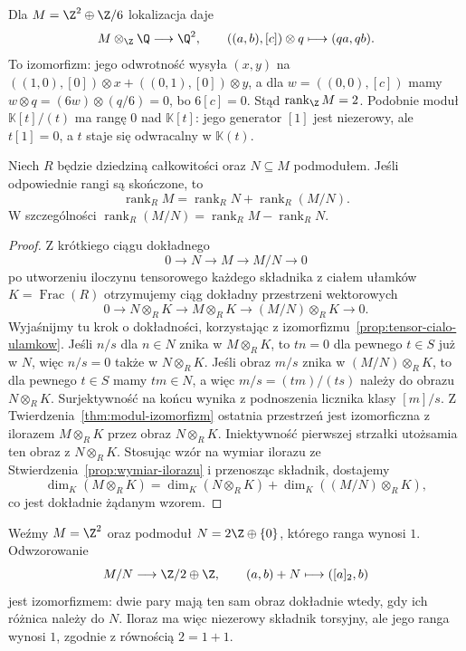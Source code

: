 \begin{przyklad}
Dla $M=\Z^2\oplus\Z/6$ lokalizacja daje
\[
 M\otimes_{\Z}\Q\longrightarrow\Q^2,\qquad
 ((a,b),[c])\otimes q\longmapsto(qa,qb).
\]
To izomorfizm: jego odwrotność wysyła $(x,y)$ na
$((1,0),[0])\otimes x+((0,1),[0])\otimes y$,
a dla $w=((0,0),[c])$ mamy
$w\otimes q=(6w)\otimes(q/6)=0$, bo $6[c]=0$.
Stąd $\operatorname{rank}_{\Z}M=2$.
Podobnie moduł $\mathbb K[t]/(t)$ ma rangę $0$
nad $\mathbb K[t]$: jego generator $[1]$ jest niezerowy,
ale $t[1]=0$, a $t$ staje się odwracalny w
$\mathbb K(t)$.
\end{przyklad}

\begin{stwierdzenie}
\label{prop:ranga-ilorazu}
Niech $R$ będzie dziedziną całkowitości oraz
$N\subseteq M$ podmodułem. Jeśli odpowiednie rangi są skończone, to
\[
\operatorname{rank}_R M
=
\operatorname{rank}_R N
+
\operatorname{rank}_R(M/N).
\]
W szczególności $\operatorname{rank}_R(M/N)
=\operatorname{rank}_R M-\operatorname{rank}_R N$.
\end{stwierdzenie}

\begin{proof}
Z krótkiego ciągu dokładnego
\[
0\longrightarrow N
\longrightarrow M
\longrightarrow M/N
\longrightarrow0
\]
po utworzeniu iloczynu tensorowego każdego składnika
z ciałem ułamków $K=\operatorname{Frac}(R)$
otrzymujemy ciąg dokładny przestrzeni wektorowych
\[
0
\longrightarrow
N\otimes_R K
\longrightarrow
M\otimes_R K
\longrightarrow
(M/N)\otimes_R K
\longrightarrow0.
\]
Wyjaśnijmy tu krok o dokładności, korzystając z
izomorfizmu~\ref{prop:tensor-cialo-ulamkow}. Jeśli $n/s$
dla $n\in N$ znika w $M\otimes_R K$, to $tn=0$
dla pewnego $t\in S$ już w $N$, więc $n/s=0$ także
w $N\otimes_R K$. Jeśli obraz $m/s$ znika w
$(M/N)\otimes_R K$, to dla pewnego $t\in S$ mamy
$tm\in N$, a więc $m/s=(tm)/(ts)$ należy do obrazu
$N\otimes_R K$. Surjektywność na końcu wynika z
podnoszenia licznika klasy $[m]/s$.
Z Twierdzenia~\ref{thm:modul-izomorfizm} ostatnia przestrzeń
jest izomorficzna z ilorazem $M\otimes_R K$
przez obraz $N\otimes_R K$. Iniektywność pierwszej strzałki
utożsamia ten obraz z $N\otimes_R K$.
Stosując wzór na wymiar ilorazu ze
Stwierdzenia~\ref{prop:wymiar-ilorazu} i przenosząc składnik, dostajemy
\[
\dim_K(M\otimes_R K)
=
\dim_K(N\otimes_R K)
+
\dim_K((M/N)\otimes_R K),
\]
co jest dokładnie żądanym wzorem.
\end{proof}

\begin{przyklad}
Weźmy $M=\Z^2$ oraz podmoduł
$N=2\Z\oplus\{0\}$, którego ranga wynosi $1$.
Odwzorowanie
\[
 M/N\longrightarrow\Z/2\oplus\Z,\qquad
 (a,b)+N\longmapsto([a]_2,b)
\]
jest izomorfizmem: dwie pary mają ten sam obraz
dokładnie wtedy, gdy ich różnica należy do $N$.
Iloraz ma więc niezerowy składnik torsyjny, ale jego
ranga wynosi $1$, zgodnie z równością $2=1+1$.
\end{przyklad}

